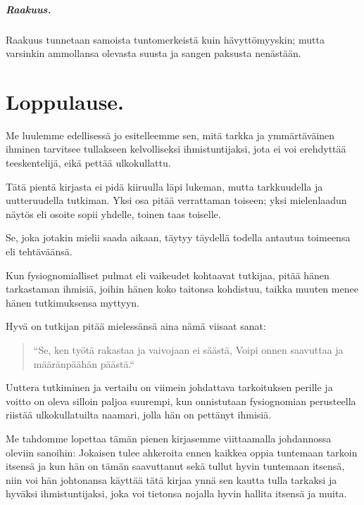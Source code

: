 \documentclass[11pt, twoside, finnish, a5paper]{book}
\begin{document}
\paragraph{Raakuus.}
Raakuus tunnetaan samoista tuntomerkeistä kuin
hävyttömyyskin; mutta varsinkin ammollansa olevasta suusta
ja sangen paksusta nenästään.

\chapter*{Loppulause.}

Me luulemme edellisessä jo esitelleemme sen, mitä
tarkka ja ymmärtäväinen ihminen tarvitsee tullakseen
kelvolliseksi ihmistuntijaksi, jota ei voi erehdyttää
teeskentelijä, eikä pettää ulkokullattu.

Tätä pientä kirjasta ei pidä kiiruulla läpi lukeman,
mutta tarkkuudella ja uutteruudella tutkiman. Yksi osa
pitää verrattaman toiseen; yksi mielenlaadun näytös eli
osoite sopii yhdelle, toinen taas toiselle.
 
Se, joka jotakin mielii saada aikaan, täytyy täydellä
todella antautua toimeensa eli tehtäväänsä.

Kun fysiognomialliset pulmat eli vaikeudet kohtaavat
tutkijaa, pitää hänen tarkastaman ihmisiä, joihin hänen
koko taitonsa kohdistuu, taikka muuten menee hänen
tutkimuksensa myttyyn.

Hyvä on tutkijan pitää mielessänsä aina nämä viisaat
sanat:

\begin{quote}
``Se, ken työtä rakastaa ja vaivojaan ei säästä,
Voipi onnen saavuttaa ja määränpäähän päästä.`` 
\end{quote}

Uuttera tutkiminen ja vertailu on viimein johdattava
tarkoituksen perille ja voitto on oleva silloin paljoa
suurempi, kun onnistutaan fysiognomian perusteella
riistää ulkokullatuilta naamari, jolla hän on pettänyt ihmisiä.

Me tahdomme lopettaa tämän pienen kirjasemme viittaamalla
johdannossa oleviin sanoihin:
Jokaisen tulee ahkeroita ennen kaikkea oppia tuntemaan tarkoin
itsensä ja kun hän on tämän saavuttanut sekä tullut
hyvin tuntemaan itsensä, niin voi hän johtonansa käyttää
tätä kirjaa ynnä sen kautta tulla tarkaksi ja hyväksi
ihmistuntijaksi, joka voi tietonsa nojalla hyvin hallita
itsensä ja muita.

\endgroup

\newpage
\centering
\vfill

\doclicenseThis
\end{document}

